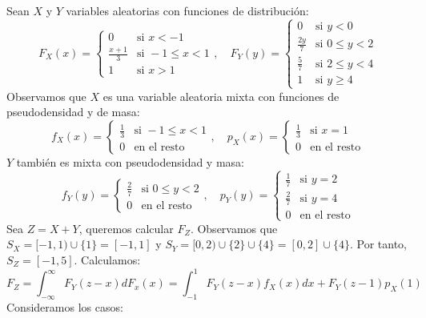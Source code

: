 \begin{exercise}
    Sean $X$ y $Y$ variables aleatorias con funciones de distribución:
    $$F_X(x) = \begin{cases}
            0             & \text{si } x < -1        \\
            \frac{x+1}{3} & \text{si } -1 \leq x < 1 \\
            1             & \text{si } x > 1
        \end{cases}, \quad
        F_Y(y) = \begin{cases}
            0            & \text{si } y < 0        \\
            \frac{2y}{7} & \text{si } 0 \leq y < 2 \\
            \frac{5}{7}  & \text{si } 2 \leq y < 4 \\
            1            & \text{si } y \geq 4
        \end{cases}$$
    Observamos que $X$ es una variable aleatoria mixta con funciones de pseudodensidad y de masa:
    $$f_X(x) = \begin{cases}
            \frac{1}{3} & \text{si } -1 \leq x < 1 \\
            0           & \text{en el resto}
        \end{cases}, \quad
        p_X(x) = \begin{cases}
            \frac{1}{3} & \text{si } x = 1   \\
            0           & \text{en el resto}
        \end{cases}$$
    $Y$ también es mixta con pseudodensidad y masa:
    $$f_Y(y) = \begin{cases}
            \frac{2}{7} & \text{si } 0 \leq y < 2 \\
            0           & \text{en el resto}
        \end{cases}, \quad
        p_Y(y) = \begin{cases}
            \frac{1}{7} & \text{si } y = 2   \\
            \frac{2}{7} & \text{si } y = 4   \\
            0           & \text{en el resto}
        \end{cases}$$
    Sea $Z = X+Y$, queremos calcular $F_Z$.
    Observamos que $S_X = [-1,1) \cup \{1\} = [-1,1]$ y $S_Y = [0,2) \cup \{2\} \cup \{4\} = [0,2] \cup \{4\}$.
    Por tanto, $S_Z = [-1, 5]$.
    Calculamos:
    $$F_Z = \int_{-\infty}^\infty F_Y(z-x)dF_x(x) = \int_{-1}^1 F_Y(z-x)f_X(x)dx + F_Y(z-1)p_X(1)$$
    Consideramos los casos:

\end{exercise}
